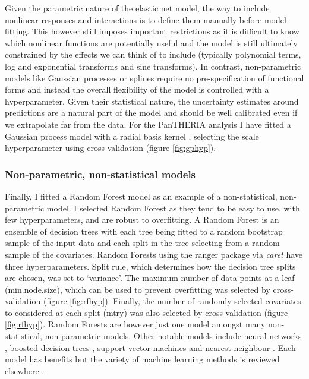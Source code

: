 \documentclass[10pt,]{article}
\begin{document}
Given the parametric nature of the elastic net model, the way to include nonlinear responses and interactions is to define them manually before model fitting.
This however still imposes important restrictions as it is difficult to know which nonlinear functions are potentially useful and the model is still ultimately constrained by the effects we can think of to include (typically polynomial terms, log and exponential transforms and sine transforms).
In contrast, non-parametric models like Gaussian processes \citep{rasmussen2004gaussian} or splines \citep{splines} require no pre-specification of functional forms and instead the overall flexibility of the model is controlled with a hyperparameter.
Given their statistical nature, the uncertainty estimates around predictions are a natural part of the model and should be well calibrated even if we extrapolate far from the data.
For the PanTHERIA analysis I have fitted a Gaussian process model with a radial basis kernel \citep{kernlab}, selecting the scale hyperparameter using cross-validation (figure \ref{fig:gphyp}).

\subsubsection{Non-parametric, non-statistical models}\label{non-parametric-non-statistical-models}

Finally, I fitted a Random Forest model \citep{breiman2001random, wright2015ranger} as an example of a non-statistical, non-parametric model.
I selected Random Forest as they tend to be easy to use, with few hyperparameters, and are robust to overfitting.
A Random Forest is an ensemble of decision trees with each tree being fitted to a random bootstrap sample of the input data and each split in the tree selecting from a random sample of the covariates.
Random Forests using the ranger \citep{wright2015ranger} package via \emph{caret} have three hyperparameters.
Split rule, which determines how the decision tree splits are chosen, was set to `variance'.
The maximum number of data points at a leaf (min.node.size), which can be used to prevent overfitting was selected by cross-validation (figure \ref{fig:rfhyp}).
Finally, the number of randomly selected covariates to considered at each split (mtry) was also selected by cross-validation (figure \ref{fig:rfhyp}).
Random Forests are however just one model amongst many non-statistical, non-parametric models.
Other notable models include neural networks \citep{neuralnets}, boosted decision trees \citep{friedman2001greedy}, support vector machines \citep{svm} and nearest neighbour \citep{altman1992introduction}.
Each model has benefits but the variety of machine learning methods is reviewed elsewhere \citep{crisci2012review}.
\end{document}
